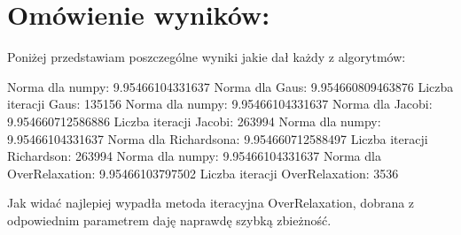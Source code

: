 \documentclass[12pt]{article}
\begin{document}
\section{Omówienie wyników:}
Poniżej przedstawiam poszczególne wyniki jakie dał każdy z algorytmów:
\begin{center}
    Norma dla numpy: 9.95466104331637 \newline
    Norma dla Gaus: 9.954660809463876 \newline
    Liczba iteracji Gaus: 135156
    \newline
    \newline
    Norma dla numpy: 9.95466104331637 \newline
    Norma dla Jacobi: 9.954660712586886 \newline
    Liczba iteracji Jacobi: 263994
    \newline
    \newline
    Norma dla numpy: 9.95466104331637 \newline 
    Norma dla Richardsona: 9.954660712588497 \newline
    Liczba iteracji Richardson: 263994
    \newline
    \newline
    Norma dla numpy: 9.95466104331637 \newline 
    Norma dla OverRelaxation: 9.95466103797502 \newline
    Liczba iteracji OverRelaxation: 3536
\end{center}
Jak widać najlepiej wypadła metoda iteracyjna OverRelaxation, dobrana z odpowiednim parametrem daję naprawdę szybką zbieżność.
\end{document}
